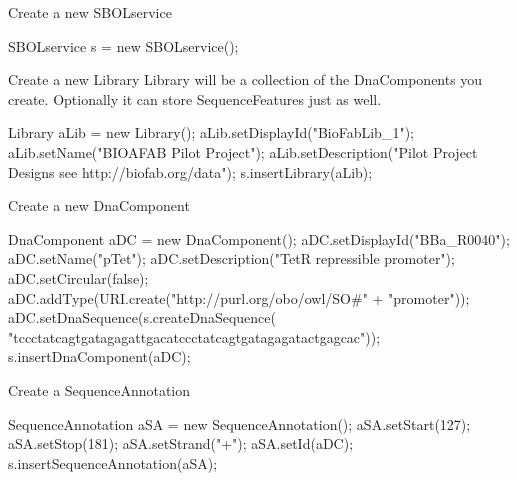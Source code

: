 \begin{DoxyEnumerate}
\item \begin{DoxyParagraph}{Create a new SBOLservice}

\begin{DoxyCode}
SBOLservice s = new SBOLservice();
\end{DoxyCode}

\end{DoxyParagraph}

\item \begin{DoxyParagraph}{Create a new Library}
Library will be a collection of the DnaComponents you create. Optionally it can store SequenceFeatures just as well. 
\begin{DoxyCode}
Library aLib = new Library();
aLib.setDisplayId("BioFabLib_1");
aLib.setName("BIOAFAB Pilot Project");
aLib.setDescription("Pilot Project Designs see http://biofab.org/data");
s.insertLibrary(aLib);
\end{DoxyCode}

\end{DoxyParagraph}

\item \begin{DoxyParagraph}{Create a new DnaComponent}

\begin{DoxyCode}
DnaComponent aDC = new DnaComponent();
aDC.setDisplayId("BBa_R0040");
aDC.setName("pTet");
aDC.setDescription("TetR repressible promoter");
aDC.setCircular(false);
aDC.addType(URI.create("http://purl.org/obo/owl/SO#" + "promoter"));
aDC.setDnaSequence(s.createDnaSequence(
                  "tccctatcagtgatagagattgacatccctatcagtgatagagatactgagcac"));
s.insertDnaComponent(aDC);
\end{DoxyCode}

\end{DoxyParagraph}

\item \begin{DoxyParagraph}{Create a SequenceAnnotation}

\begin{DoxyCode}
SequenceAnnotation aSA = new SequenceAnnotation();
aSA.setStart(127);
aSA.setStop(181);
aSA.setStrand("+");
aSA.setId(aDC);
s.insertSequenceAnnotation(aSA);
\end{DoxyCode}

\end{DoxyParagraph}


\end{DoxyEnumerate}
